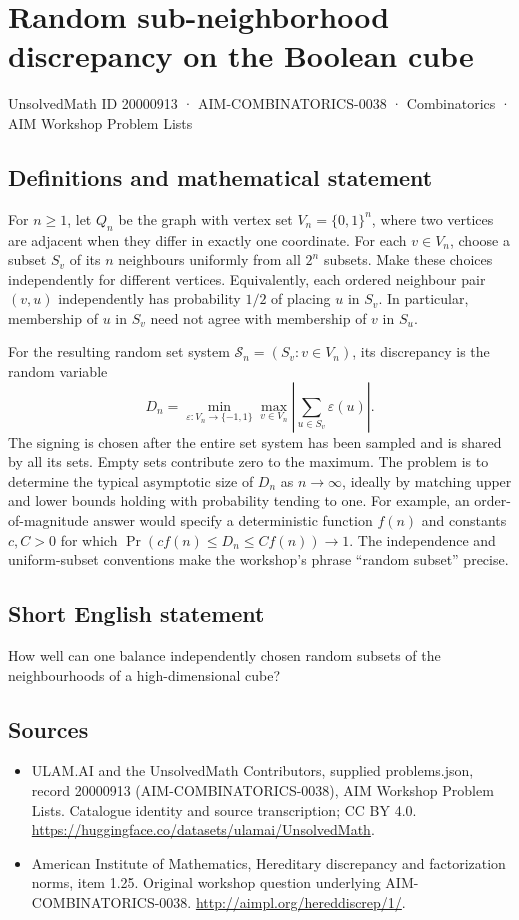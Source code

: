 \documentclass[11pt,a4paper]{article}
\begin{document}
\section*{Random sub-neighborhood discrepancy on the Boolean cube}\label{20000913}
{\small UnsolvedMath ID 20000913 · AIM-COMBINATORICS-0038 · Combinatorics · AIM Workshop Problem Lists}
\subsection{Definitions and mathematical statement}
For $n\ge1$, let $Q_n$ be the graph with vertex set $V_n=\{0,1\}^n$,
where two vertices are adjacent when they differ in exactly one
coordinate. For each $v\in V_n$, choose a subset $S_v$ of its $n$
neighbours uniformly from all $2^n$ subsets. Make these choices
independently for different vertices. Equivalently, each ordered
neighbour pair $(v,u)$ independently has probability $1/2$ of placing
$u$ in $S_v$. In particular, membership of $u$ in $S_v$ need not agree
with membership of $v$ in $S_u$.

For the resulting random set system $\mathcal S_n=(S_v:v\in V_n)$,
its discrepancy is the random variable
\[
 D_n=\min_{\varepsilon:V_n\to\{-1,1\}}
        \max_{v\in V_n}\left|\sum_{u\in S_v}\varepsilon(u)\right|.
\]
The signing is chosen after the entire set system has been sampled and
is shared by all its sets. Empty sets contribute zero to the maximum.
The problem is to determine the typical asymptotic size of $D_n$ as
$n\to\infty$, ideally by matching upper and lower bounds holding with
probability tending to one. For example, an order-of-magnitude answer
would specify a deterministic function $f(n)$ and constants $c,C>0$
for which $\Pr(c f(n)\le D_n\le C f(n))\to1$.
The independence and uniform-subset conventions make the workshop's
phrase ``random subset'' precise.
\subsection{Short English statement}
How well can one balance independently chosen random subsets of the neighbourhoods of a high-dimensional cube?
\subsection{Sources}
\begin{itemize}
\item[S1] ULAM.AI and the UnsolvedMath Contributors, supplied problems.json, record 20000913 (AIM-COMBINATORICS-0038), AIM Workshop Problem Lists. Catalogue identity and source transcription; CC BY 4.0.
\url{https://huggingface.co/datasets/ulamai/UnsolvedMath}.
\item[S2] American Institute of Mathematics, Hereditary discrepancy and factorization norms, item 1.25. Original workshop question underlying AIM-COMBINATORICS-0038.
\url{http://aimpl.org/hereddiscrep/1/}.
\end{itemize}
\end{document}
